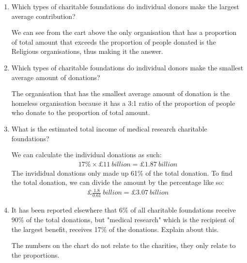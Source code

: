\documentclass[12pt,titlepage]{article}
\begin{document}
\begin{itemize}
{        \begin{enumerate}[label=\Alph*.]
            \item {
                Which types of charitable foundations do individual donors make the largest average contribution?

                We can see from the cart above the only organisation that has a proportion of total amount that exceeds the proportion of people donated is the Religious organisations, thus making it the answer.
            }
            \item {
                Which types of charitable foundations do individual donors make the smallest average amount of donations?

                The organisation that has the smallest average amount of donation is the homeless organisation because it has a 3:1 ratio of the proportion of people who donate to the proportion of total amount.
            }
            \item {
                What is the estimated total income of medical research charitable foundations?

                We can calculate the individual donations as such:
                \begin{align*}
                    17\%\times\pounds11~billion=\pounds1.87~billion
                \end{align*}
                The invididual donations only made up 61\% of the total donation. To find the total donation, we can divide the amount by the percentage like so:
                \begin{align*}
                    \pounds\frac{1.8}{0.61}~billion = \pounds3.07~billion
                \end{align*}
            }
            \item {
                It has been reported elsewhere that 6\% of all charitable foundations receive 90\% of the total
                donations, but "medical research" which is the recipient of the largest benefit, receives 17\% of the
                donations. Explain about this.

                The numbers on the chart do not relate to the charities, they only relate to the proportions.
            }
        \end{enumerate}
    }
\end{itemize}
\end{document}
